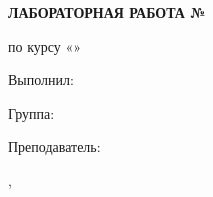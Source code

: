 \begin{titlepage}
\thispagestyle{empty}
\setlength{\parindent}{0pt}
\fontsize{14bp}{18.48bp}\selectfont
\centering
{\bfseries\ReportUniversity\par
\ReportUniversityStatus\par}
\vspace{18bp}
\ReportInstitute\par
\ReportDepartment\par

\vspace{120bp}
{\bfseries ЛАБОРАТОРНАЯ РАБОТА № \ReportNumber\par}
\vspace{12bp}
по курсу «\ReportCourse»\par
\vspace{6bp}
\ReportTopic\par
\vspace{6bp}
\ReportVariant\par

\vspace{120bp}
\hspace*{95mm}\begin{minipage}[t]{\dimexpr\textwidth-95mm\relax}
\raggedright
Выполнил: \ReportAuthor\par
\vspace{6bp}
Группа: \ReportGroup\par
\vspace{6bp}
Преподаватель: \ReportTeacher\par
\end{minipage}\par

\vspace{150bp}
\ReportCity, \ReportYear\par
\end{titlepage}
\setcounter{page}{2}
